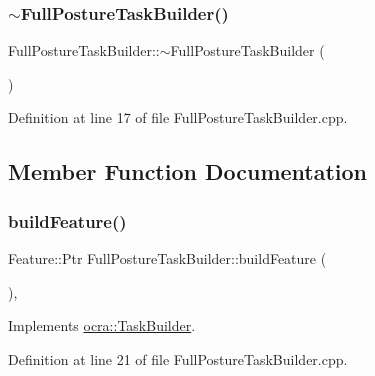 \subsubsection{\texorpdfstring{$\sim$\+Full\+Posture\+Task\+Builder()}{~FullPostureTaskBuilder()}}
{\footnotesize\ttfamily Full\+Posture\+Task\+Builder\+::$\sim$\+Full\+Posture\+Task\+Builder (\begin{DoxyParamCaption}{ }\end{DoxyParamCaption})\hspace{0.3cm}{\ttfamily [virtual]}}



Definition at line 17 of file Full\+Posture\+Task\+Builder.\+cpp.



\subsection{Member Function Documentation}
\hypertarget{classocra_1_1FullPostureTaskBuilder_a7651ca4fd2ef7c8096a399b128981122}{}\label{classocra_1_1FullPostureTaskBuilder_a7651ca4fd2ef7c8096a399b128981122} 
\subsubsection{\texorpdfstring{build\+Feature()}{buildFeature()}}
{\footnotesize\ttfamily Feature\+::\+Ptr Full\+Posture\+Task\+Builder\+::build\+Feature (\begin{DoxyParamCaption}{ }\end{DoxyParamCaption})\hspace{0.3cm}{\ttfamily [protected]}, {\ttfamily [virtual]}}



Implements \hyperlink{classocra_1_1TaskBuilder_a58c0dc416a9607a344a080248ee26ac2}{ocra\+::\+Task\+Builder}.



Definition at line 21 of file Full\+Posture\+Task\+Builder.\+cpp.

\hypertarget{classocra_1_1FullPostureTaskBuilder_ac9ea83ee3f872995c6dc214e91fc28a0}{}\label{classocra_1_1FullPostureTaskBuilder_ac9ea83ee3f872995c6dc214e91fc28a0} 
